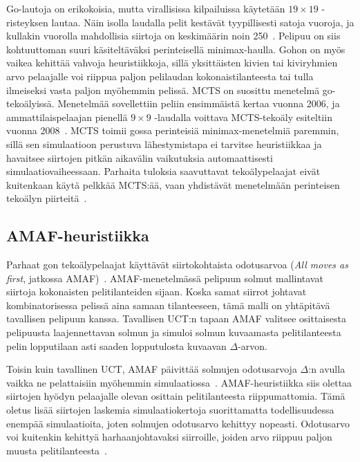\documentclass[12pt,finnish]{tktltiki2}
\theoremstyle{definition}
\theoremstyle{remark}
\begin{document}
Go-lautoja on erikokoisia, mutta virallisissa kilpailuissa käytetään $19 \times 19$ -risteyksen lautaa. Näin isolla laudalla pelit kestävät tyypillisesti satoja vuoroja, ja kullakin vuorolla mahdollisia siirtoja on keskimäärin noin 250~\cite{browne}. Pelipuu on siis kohtuuttoman suuri käsiteltäväksi perinteisellä minimax-haulla. Gohon on myös vaikea kehittää vahvoja heuristiikkoja, sillä yksittäisten kivien tai kiviryhmien arvo pelaajalle voi riippua paljon pelilaudan kokonaistilanteesta tai tulla ilmeiseksi vasta paljon myöhemmin pelissä.
\newpage
MCTS on suosittu menetelmä go-tekoälyissä. Menetelmää sovellettiin peliin ensimmäistä kertaa vuonna 2006, ja ammattilaispelaajan pienellä $9 \times 9$ -laudalla voittava MCTS-tekoäly esiteltiin vuonna 2008~\cite{browne}. MCTS toimii gossa perinteisiä minimax-menetelmiä paremmin, sillä sen simulaatioon perustuva lähestymistapa ei tarvitse heuristiikkaa ja havaitsee siirtojen pitkän aikavälin vaikutuksia automaattisesti simulaatiovaiheessaan. Parhaita tuloksia saavuttavat tekoälypelaajat eivät kuitenkaan käytä pelkkää MCTS:ää, vaan yhdistävät menetelmään perinteisen tekoälyn piirteitä~\cite{browne}.

\subsection{AMAF-heuristiikka}

Parhaat gon tekoälypelaajat käyttävät siirtokohtaista odotusarvoa (\textit{All moves as first}, jatkossa AMAF)~\cite{browne}. AMAF-menetelmässä pelipuun solmut mallintavat siirtoja kokonaisten pelitilanteiden sijaan. Koska samat siirrot johtavat kombinatorisessa pelissä aina samaan tilanteeseen, tämä malli on yhtäpitävä tavallisen pelipuun kanssa. Tavallisen UCT:n tapaan AMAF valitsee osittaisesta pelipuusta laajennettavan solmun ja simuloi solmun kuvaamasta pelitilanteesta pelin lopputilaan asti saaden lopputulosta kuvaavan $\Delta$-arvon.

Toisin kuin tavallinen UCT, AMAF päivittää solmujen odotusarvoja $\Delta$:n avulla vaikka ne pelattaisiin myöhemmin simulaatiossa~\cite{browne, helmbold}. AMAF-heuristiikka siis olettaa siirtojen hyödyn pelaajalle olevan osittain pelitilanteesta riippumattomia. Tämä oletus lisää siirtojen laskemia simulaatiokertoja suorittamatta todellisuudessa enempää simulaatioita, joten solmujen odotusarvo kehittyy nopeasti. Odotusarvo voi kuitenkin kehittyä harhaanjohtavaksi siirroille, joiden arvo riippuu paljon muusta pelitilanteesta~\cite{helmbold}.
\end{document}
